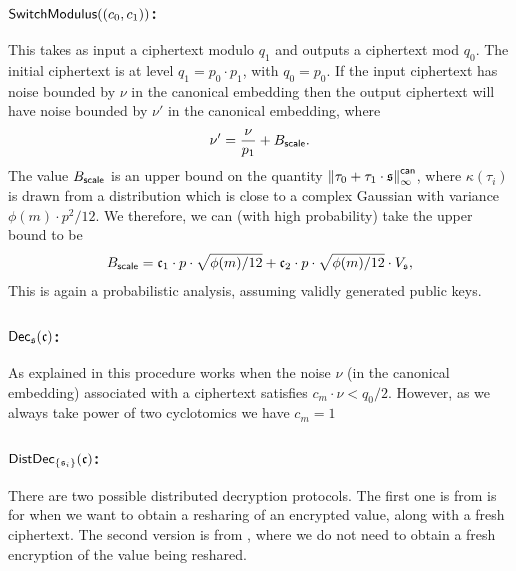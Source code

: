 \subsubsection{$\mathsf{SwitchModulus}((c_0,c_1))$:}
This takes as input a ciphertext modulo $q_1$ and outputs a ciphertext mod $q_0$.
The initial ciphertext is at level $q_1=p_0 \cdot p_1$, with $q_0=p_0$.
If the input ciphertext has noise bounded by $\nu$
in the canonical embedding
then the output ciphertext will have noise bounded by $\nu'$ in
the canonical embedding, where
\[ \nu' = \frac{\nu}{p_1} + B_{\mathsf{scale}}. \]
The value $B_{\mathsf{scale}}$ is an upper bound on the quantity
${\Vert \tau_0+\tau_1 \cdot \mathfrak{s} \Vert}_\infty^{\mathsf{can}}$, where
$\kappa(\tau_i)$ is drawn from a distribution
which is close to a complex Gaussian with variance $\phi(m)\cdot p^2/12$.
We therefore, we can (with high probability) take the upper
bound to be
\begin{align*}
    B_{\mathsf{scale}} 
	&= \mathfrak{c}_1 \cdot p \cdot \sqrt{ \phi(m)/12}
	+  \mathfrak{c}_2 \cdot p \cdot \sqrt{ \phi(m)/12} \cdot V_{\mathfrak{s}}, \\
\end{align*}
This is again a probabilistic analysis, assuming validly generated
public keys.

\subsubsection{$\mathsf{Dec}_{\mathfrak{s}}(\mathfrak{c})$:}
As explained in \cite{SPDZ2,GHS12c} this procedure works when the noise 
$\nu$ (in the canonical embedding) associated with a ciphertext satisfies $c_m \cdot \nu  < q_{0}/2$.
However, as we always take power of two cyclotomics we have $c_m=1$

\subsubsection{$\mathsf{DistDec}_{\{\mathfrak{s}_i\}}(\mathfrak{c})$:}
There are two possible distributed decryption protocols.
The first one is from \cite{SPDZ} is for when we want to obtain a
resharing of an encrypted value, along with a fresh ciphertext.
The second version is from \cite{KPR}, where we do not need to
obtain a fresh encryption of the value being reshared.


